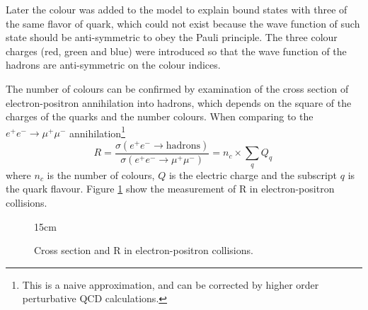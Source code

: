 Later the colour was added to the model to explain bound states with three of the same flavor of quark, which could not exist because the wave function of such state should be anti-symmetric to obey the Pauli principle. The three colour charges (red, green and blue) were introduced so that the wave function of the hadrons are anti-symmetric on the colour indices.

The number of colours can be confirmed by examination of the cross section of electron-positron annihilation into hadrons, which depends on the square of the charges of the quarks and the number colours. When comparing to the $e^+e^- \rightarrow \mu^+\mu^-$ annihilation\footnote{This is a naive approximation, and can be corrected by higher order perturbative QCD calculations.}
\begin{equation}
    R = \frac{\sigma(e^+e^- \rightarrow \text{hadrons})}{\sigma(e^+e^- \rightarrow \mu^+\mu^-)} = n_c \times \sum_q Q_q\,
\end{equation}
where $n_c$ is the number of colours, $Q$ is the electric charge and the subscript $q$ is the quark flavour. Figure \ref{fig:Rsigma} show the measurement of R in electron-positron collisions.

\begin{figure}[!htm]{15cm} %
\caption{Cross section and R in electron-positron collisions.}%
\label{fig:Rsigma}
\end{figure}


